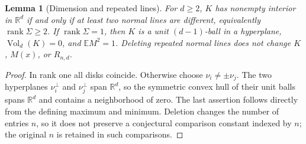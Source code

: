 \documentclass[10pt,reqno]{amsart}
\newtheorem{lemma}[theorem]{Lemma}
\theoremstyle{definition}
\theoremstyle{remark}
\newcommand{\R}{\mathbb R}
\newcommand{\E}{\mathbb E}
\newcommand{\Vol}{\operatorname{Vol}}
\newcommand{\rank}{\operatorname{rank}}
\begin{document}
\begin{lemma}[Dimension and repeated lines]\label{lem:dimension}
For $d\ge2$, $K$ has nonempty interior in $\R^d$ if and only if at least two normal lines are different, equivalently $\rank\Sigma\ge2$. If $\rank\Sigma=1$, then $K$ is a unit $(d-1)$-ball in a hyperplane, $\Vol_d(K)=0$, and $\E M^2=1$. Deleting repeated normal lines does not change $K$, $M(x)$, or $R_{n,d}$.
\end{lemma}
\begin{proof}
In rank one all disks coincide. Otherwise choose $\nu_i\ne\pm\nu_j$.
The two hyperplanes $\nu_i^\perp$ and $\nu_j^\perp$ span $\R^d$, so the symmetric convex hull of their unit balls spans $\R^d$ and contains a neighborhood of zero. The last assertion follows directly from the defining maximum and minimum. Deletion changes the number of entries $n$, so it does not preserve a conjectural comparison constant indexed by $n$; the original $n$ is retained in such comparisons.
\end{proof}
\end{document}
